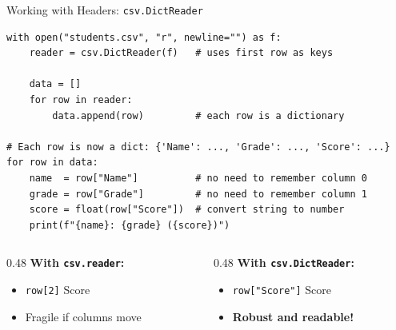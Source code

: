 \documentclass{csbeamer}
\begin{document}
\begin{frame}[fragile]{Working with Headers: \texttt{csv.DictReader}}
    \begin{lstlisting}
with open("students.csv", "r", newline="") as f:
    reader = csv.DictReader(f)   # uses first row as keys

    data = []
    for row in reader:
        data.append(row)         # each row is a dictionary

# Each row is now a dict: {'Name': ..., 'Grade': ..., 'Score': ...}
for row in data:
    name  = row["Name"]          # no need to remember column 0
    grade = row["Grade"]         # no need to remember column 1
    score = float(row["Score"])  # convert string to number
    print(f"{name}: {grade} ({score})")
    \end{lstlisting}

    \pause

    \begin{columns}
        \begin{column}{0.48\textwidth}
            \textbf{With \texttt{csv.reader}:}
            \begin{itemize}
                \item \texttt{row[2]} \textrightarrow{} Score
                \item Fragile if columns move
            \end{itemize}
        \end{column}
        \begin{column}{0.48\textwidth}
            \textbf{With \texttt{csv.DictReader}:}
            \begin{itemize}
                \item \texttt{row["Score"]} \textrightarrow{} Score
                \item \textcolor{marigold}{\textbf{Robust and readable!}}
            \end{itemize}
        \end{column}
    \end{columns}
\end{frame}
\end{document}
